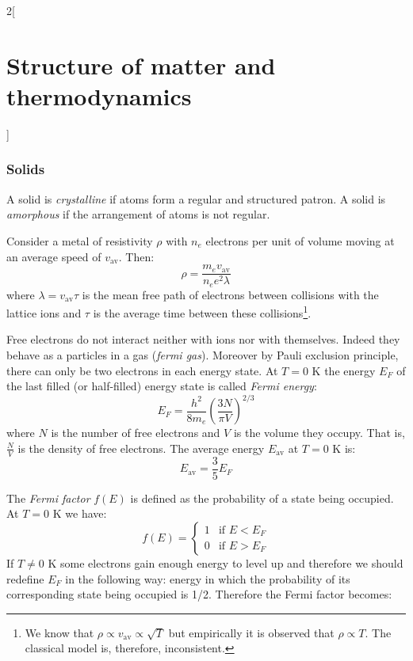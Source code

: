 \documentclass[../../../main.tex]{subfiles}
\begin{document}
\begin{multicols}{2}[\section{Structure of matter and thermodynamics}]
  \subsubsection{Solids}
  \begin{definition}
    A solid is \emph{crystalline} if atoms form a regular and structured patron. A solid is \emph{amorphous} if the arrangement of atoms is not regular.
  \end{definition}
  \begin{proposition}
    Consider a metal of resistivity $\rho$ with $n_e$ electrons per unit of volume moving at an average speed of $v_\text{av}$. Then: $$\rho=\frac{m_ev_\text{av}}{n_ee^2\lambda}$$ where $\lambda=v_\text{av}\tau$ is the mean free path of electrons between collisions with the lattice ions and $\tau$ is the average time between these collisions\footnote{We know that $\rho\propto v_\text{av}\propto\sqrt{T}$ but empirically it is observed that $\rho\propto T$. The classical model is, therefore, inconsistent.}.
  \end{proposition}
  \begin{proposition}
    Free electrons do not interact neither with ions nor with themselves. Indeed they behave as a particles in a gas (\emph{fermi gas}). Moreover by Pauli exclusion principle, there can only be two electrons in each energy state. At $T=0\text{ K}$ the energy $E_F$ of the last filled (or half-filled) energy state is called \emph{Fermi energy}: $$E_F=\frac{h^2}{8m_e}{\left(\frac{3N}{\pi V}\right)}^{2/3}$$ where $N$ is the number of free electrons and $V$ is the volume they occupy. That is, $\frac{N}{V}$ is the density of free electrons. The average energy $E_\text{av}$ at $T=0\text{ K}$ is: $$E_\text{av}=\frac{3}{5}E_F$$
  \end{proposition}
  \begin{definition}
    The \emph{Fermi factor} $f(E)$ is defined as the probability of a state being occupied. At $T=0\text{ K}$ we have: $$f(E)=
      \begin{cases}
        1 & \text{if }E<E_F \\
        0 & \text{if }E>E_F
      \end{cases}
    $$
    If $T\ne 0\text{ K}$ some electrons gain enough energy to level up and therefore we should redefine $E_F$ in the following way: energy in which the probability of its corresponding state being occupied is 1/2. Therefore the Fermi factor becomes:
    \begin{center}

\end{center}
\end{definition}
\end{multicols}
\end{document}
